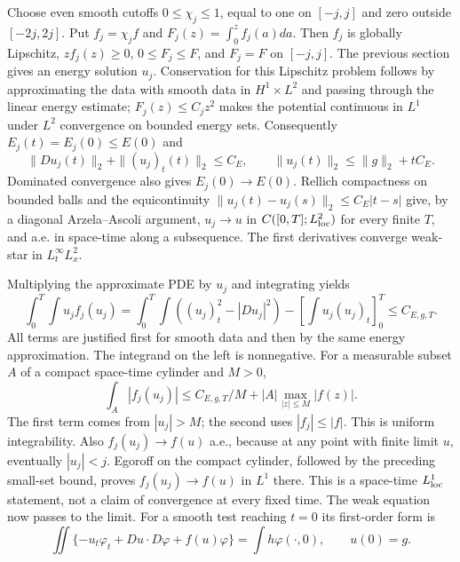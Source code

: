 \begin{expandedproof}
Choose even smooth cutoffs $0\le\chi_j\le1$, equal to one on
$[-j,j]$ and zero outside $[-2j,2j]$. Put $f_j=\chi_jf$ and
$F_j(z)=\int_0^z f_j(a)da$. Then $f_j$ is globally Lipschitz,
$zf_j(z)\ge0$, $0\le F_j\le F$, and $F_j=F$ on $[-j,j]$.
The previous section gives an energy solution $u_j$.
Conservation for this Lipschitz problem follows by approximating the
data with smooth data in $H^1\times L^2$ and passing through the
linear energy estimate; $F_j(z)\le C_jz^2$ makes the potential
continuous in $L^1$ under $L^2$ convergence on bounded energy sets.
Consequently $E_j(t)=E_j(0)\le E(0)$ and
\[
 \|Du_j(t)\|_2+\|(u_j)_t(t)\|_2\le C_E,\qquad
 \|u_j(t)\|_2\le\|g\|_2+tC_E.
\]
Dominated convergence also gives $E_j(0)\to E(0)$.
Rellich compactness on bounded balls and the equicontinuity
$\|u_j(t)-u_j(s)\|_2\le C_E|t-s|$ give, by a diagonal
Arzela--Ascoli argument,
$u_j\to u$ in $C([0,T];L^2_{\rm loc})$ for every finite $T$,
and a.e. in space-time along a subsequence. The first derivatives
converge weak-star in $L^\infty_tL^2_x$.

Multiplying the approximate PDE by $u_j$ and integrating yields
\[
 \int_0^T\!\int u_j f_j(u_j)
 =\int_0^T\!\int((u_j)_t^2-|Du_j|^2)
      -\left[\int u_j(u_j)_t\right]_0^T\le C_{E,g,T}.
\]
All terms are justified first for smooth data and then by the same
energy approximation. The integrand on the left is nonnegative.
For a measurable subset $A$ of a compact space-time cylinder and $M>0$,
\[
 \int_A|f_j(u_j)|\le C_{E,g,T}/M
              +|A|\max_{|z|\le M}|f(z)|.
\]
The first term comes from $|u_j|>M$; the second uses $|f_j|\le|f|$.
This is uniform integrability. Also $f_j(u_j)\to f(u)$ a.e., because
at any point with finite limit $u$, eventually $|u_j|<j$.
Egoroff on the compact cylinder, followed by the preceding small-set
bound, proves $f_j(u_j)\to f(u)$ in $L^1$ there. This is a
space-time $L^1_{\rm loc}$ statement, not a claim of convergence
at every fixed time. The weak equation now passes to the limit.
For a smooth test reaching $t=0$ its first-order form is
\[
 \iint\{-u_t\varphi_t+Du\cdot D\varphi+f(u)\varphi\}
       =\int h\varphi(\cdot,0),\qquad u(0)=g.
\]


\end{expandedproof}
